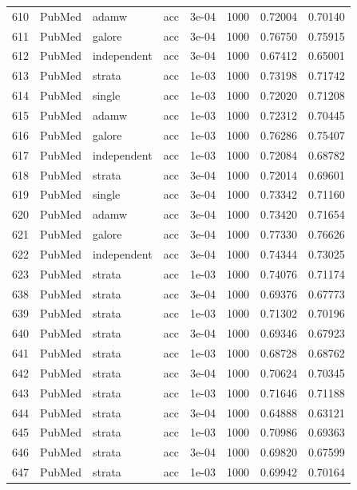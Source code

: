 \begin{longtable}{rlllrrrr}
610 & PubMed & adamw & acc & 3e-04 & 1000 & 0.72004 & 0.70140 \\
611 & PubMed & galore & acc & 3e-04 & 1000 & 0.76750 & 0.75915 \\
612 & PubMed & independent & acc & 3e-04 & 1000 & 0.67412 & 0.65001 \\
\rowcolor{oursbg}
613 & PubMed & strata & acc & 1e-03 & 1000 & 0.73198 & 0.71742 \\
614 & PubMed & single & acc & 1e-03 & 1000 & 0.72020 & 0.71208 \\
615 & PubMed & adamw & acc & 1e-03 & 1000 & 0.72312 & 0.70445 \\
616 & PubMed & galore & acc & 1e-03 & 1000 & 0.76286 & 0.75407 \\
617 & PubMed & independent & acc & 1e-03 & 1000 & 0.72084 & 0.68782 \\
\rowcolor{oursbg}
618 & PubMed & strata & acc & 3e-04 & 1000 & 0.72014 & 0.69601 \\
619 & PubMed & single & acc & 3e-04 & 1000 & 0.73342 & 0.71160 \\
620 & PubMed & adamw & acc & 3e-04 & 1000 & 0.73420 & 0.71654 \\
621 & PubMed & galore & acc & 3e-04 & 1000 & 0.77330 & 0.76626 \\
622 & PubMed & independent & acc & 3e-04 & 1000 & 0.74344 & 0.73025 \\
\rowcolor{oursbg}
623 & PubMed & strata & acc & 1e-03 & 1000 & 0.74076 & 0.71174 \\
638 & PubMed & strata & acc & 3e-04 & 1000 & 0.69376 & 0.67773 \\
\rowcolor{oursbg}
639 & PubMed & strata & acc & 1e-03 & 1000 & 0.71302 & 0.70196 \\
640 & PubMed & strata & acc & 3e-04 & 1000 & 0.69346 & 0.67923 \\
\rowcolor{oursbg}
641 & PubMed & strata & acc & 1e-03 & 1000 & 0.68728 & 0.68762 \\
642 & PubMed & strata & acc & 3e-04 & 1000 & 0.70624 & 0.70345 \\
\rowcolor{oursbg}
643 & PubMed & strata & acc & 1e-03 & 1000 & 0.71646 & 0.71188 \\
644 & PubMed & strata & acc & 3e-04 & 1000 & 0.64888 & 0.63121 \\
\rowcolor{oursbg}
645 & PubMed & strata & acc & 1e-03 & 1000 & 0.70986 & 0.69363 \\
646 & PubMed & strata & acc & 3e-04 & 1000 & 0.69820 & 0.67599 \\
\rowcolor{oursbg}
647 & PubMed & strata & acc & 1e-03 & 1000 & 0.69942 & 0.70164 \\

\end{longtable}
